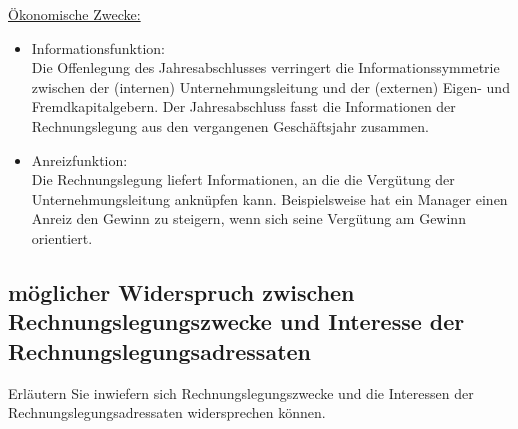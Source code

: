 \documentclass[paper=a4, fontsize=11pt]{scrartcl}
\numberwithin{equation}{section}
\numberwithin{figure}{section}
\numberwithin{table}{section}
\begin{document}
\underline{Ökonomische Zwecke:}

\begin{itemize}
\item Informationsfunktion: \\
Die Offenlegung des Jahresabschlusses verringert die Informationssymmetrie zwischen der (internen) Unternehmungsleitung und der (externen) Eigen- und Fremdkapitalgebern. Der Jahresabschluss fasst die Informationen der Rechnungslegung aus den vergangenen Geschäftsjahr zusammen.

\item Anreizfunktion: \\
Die Rechnungslegung liefert Informationen, an die die Vergütung der Unternehmungsleitung anknüpfen kann. Beispielsweise hat ein Manager einen Anreiz den Gewinn zu steigern, wenn sich seine Vergütung am Gewinn orientiert.
\end{itemize}


\subsection{möglicher Widerspruch zwischen Rechnungslegungszwecke und Interesse der Rechnungslegungsadressaten}

Erläutern Sie inwiefern sich Rechnungslegungszwecke und die Interessen der Rechnungslegungsadressaten widersprechen können. \\
\end{document}
